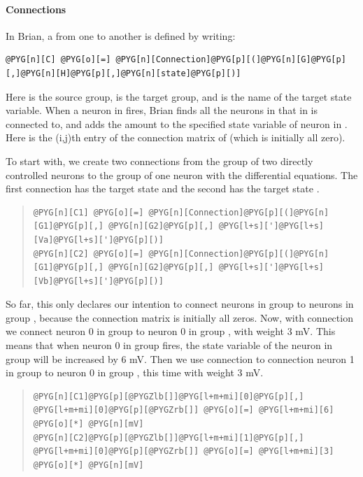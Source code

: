 \documentclass[letterpaper,10pt,english]{manual}
\begin{document}
\paragraph{Connections}

In Brian, a \hyperlink{brian.Connection}{} from one \hyperlink{brian.NeuronGroup}{} to another is
defined by writing:

\begin{Verbatim}[commandchars=@\[\]]
@PYG[n][C] @PYG[o][=] @PYG[n][Connection]@PYG[p][(]@PYG[n][G]@PYG[p][,]@PYG[n][H]@PYG[p][,]@PYG[n][state]@PYG[p][)]
\end{Verbatim}

Here  is the source group,  is the target group, and  is the
name of the target state variable. When a neuron  in  fires, Brian
finds all the neurons  in  that  in  is connected to, and adds
the amount  to the specified state variable of neuron  in .
Here  is the (i,j)th entry of the connection matrix of  (which
is initially all zero).

To start with, we create two connections from the group of two
directly controlled neurons to the group of one neuron with the
differential equations. The first connection has the target state 
and the second has the target state .
\begin{quote}

\begin{Verbatim}[commandchars=@\[\]]
@PYG[n][C1] @PYG[o][=] @PYG[n][Connection]@PYG[p][(]@PYG[n][G1]@PYG[p][,] @PYG[n][G2]@PYG[p][,] @PYG[l+s][']@PYG[l+s][Va]@PYG[l+s][']@PYG[p][)]
@PYG[n][C2] @PYG[o][=] @PYG[n][Connection]@PYG[p][(]@PYG[n][G1]@PYG[p][,] @PYG[n][G2]@PYG[p][,] @PYG[l+s][']@PYG[l+s][Vb]@PYG[l+s][']@PYG[p][)]
\end{Verbatim}
\end{quote}

So far, this only declares our intention to connect neurons in group
 to neurons in group , because the connection matrix is initially
all zeros. Now, with connection  we connect neuron 0 in group 
to neuron 0 in group , with weight 3 mV. This means that when neuron
0 in group  fires, the state variable  of the neuron in group 
will be increased by 6 mV. Then we use connection  to connection
neuron 1 in group  to neuron 0 in group , this time with weight
3 mV.
\begin{quote}

\begin{Verbatim}[commandchars=@\[\]]
@PYG[n][C1]@PYG[p][@PYGZlb[]]@PYG[l+m+mi][0]@PYG[p][,] @PYG[l+m+mi][0]@PYG[p][@PYGZrb[]] @PYG[o][=] @PYG[l+m+mi][6] @PYG[o][*] @PYG[n][mV]
@PYG[n][C2]@PYG[p][@PYGZlb[]]@PYG[l+m+mi][1]@PYG[p][,] @PYG[l+m+mi][0]@PYG[p][@PYGZrb[]] @PYG[o][=] @PYG[l+m+mi][3] @PYG[o][*] @PYG[n][mV]
\end{Verbatim}
\end{quote}
\end{document}

